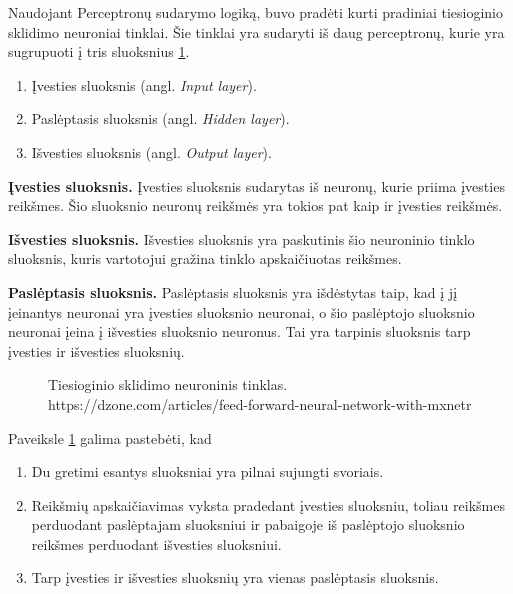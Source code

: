 Naudojant Perceptronų sudarymo logiką, buvo pradėti kurti pradiniai tiesioginio sklidimo neuroniai tinklai. Šie tinklai yra sudaryti iš daug perceptronų, kurie yra sugrupuoti į tris sluoksnius \ref{fig:feedforfff}.
\begin{enumerate}
  \item Įvesties sluoksnis (angl. \textit{Input layer}).
  \item Paslėptasis sluoksnis (angl. \textit{Hidden layer}).
  \item Išvesties sluoksnis (angl. \textit{Output layer}).
\end{enumerate}

\textbf{Įvesties sluoksnis.} Įvesties sluoksnis sudarytas iš neuronų, kurie priima įvesties reikšmes. Šio sluoksnio neuronų reikšmės yra tokios pat kaip ir įvesties reikšmės. \cite{Sibanjan2017}

\textbf{Išvesties sluoksnis.} Išvesties sluoksnis yra paskutinis šio neuroninio tinklo sluoksnis, kuris vartotojui gražina tinklo apskaičiuotas reikšmes. \cite{Sibanjan2017}

\textbf{Paslėptasis sluoksnis.} Paslėptasis sluoksnis yra išdėstytas taip, kad į jį įeinantys neuronai yra įvesties sluoksnio neuronai, o šio paslėptojo sluoksnio neuronai įeina į išvesties sluoksnio neuronus. Tai yra tarpinis sluoksnis tarp įvesties ir išvesties sluoksnių. \cite{Sibanjan2017}

\begin{figure}[h!]
  \centering
{}
\caption{Tiesioginio sklidimo neuroninis tinklas.\\https://dzone.com/articles/feed-forward-neural-network-with-mxnetr}
\label{fig:feedforfff}
\end{figure}

Paveiksle \ref{fig:feedforfff} galima pastebėti, kad
\begin{enumerate}
  \item Du gretimi esantys sluoksniai yra pilnai sujungti svoriais.
  \item Reikšmių apskaičiavimas vyksta pradedant įvesties sluoksniu, toliau reikšmes perduodant paslėptajam sluoksniui ir pabaigoje iš paslėptojo sluoksnio reikšmes perduodant išvesties sluoksniui.
  \item Tarp įvesties ir išvesties sluoksnių yra vienas paslėptasis sluoksnis.
\end{enumerate}


